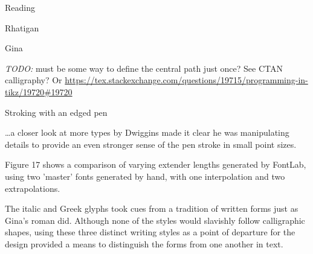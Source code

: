 \documentclass[11pt]{PalisadesLakesBook}
\begin{document}
\begin{plSection}{Reading}
\begin{plSection}{Rhatigan}
\begin{plSection}{Gina}
\begin{plSection}{}
\emph{TODO:} must be some way to define the central path just once? 
See CTAN calligraphy?
Or \url{https://tex.stackexchange.com/questions/19715/programming-in-tikz/19720#19720}


\begin{plDiagram}{Stroking with an edged pen}{}
\center
{}
\end{plDiagram}

\begin{plQuote}{}{}
\ldots a closer look at more types 
by Dwiggins made it clear he was manipulating details to provide 
an even stronger sense of the pen stroke in small point sizes.
\end{plQuote}

Figure 17 shows a comparison of varying extender lengths
generated by FontLab, using two 'master' fonts generated by hand,
with one interpolation and two extrapolations.

\begin{plQuote}{}{}
The italic and Greek glyphs took cues from a tradition of
written forms just as Gina's roman did.
Although none of the styles would slavishly follow calligraphic 
shapes,
using these three distinct writing styles as a point of departure
for the design provided a means to distinguish the forms from one
another in text.
\end{plQuote}


\end{plSection}
\end{plSection}
\end{plSection}
\end{plSection}
\end{document}
